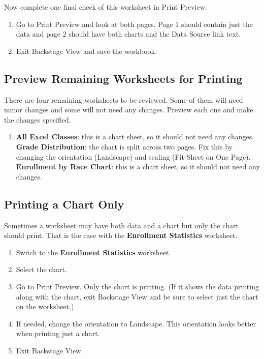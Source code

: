 Now complete one final check of this worksheet in Print Preview.

\begin{enumerate}
	\item Go to Print Preview and look at both pages. Page $ 1 $ should contain just the data and page $ 2 $ should have both charts and the Data Source link text.
	\item Exit Backstage View and save the workbook.
\end{enumerate}

\subsection{Preview Remaining Worksheets for Printing}

There are four remaining worksheets to be reviewed. Some of them will need minor changes and some will not need any changes. Preview each one and make the changes specified.

\begin{enumerate}
	\item \textbf{All Excel Classes}: this is a chart sheet, so it should not need any changes.
	\textbf{Grade Distribution}: the chart is split across two pages. Fix this by changing the orientation (Landscape) and scaling (Fit Sheet on One Page).
	\textbf{Enrollment by Race Chart}: this is a chart sheet, so it should not need any changes.
\end{enumerate}

\subsection{Printing a Chart Only}

Sometimes a worksheet may have both data and a chart but only the chart should print. That is the case with the \textbf{Enrollment Statistics} worksheet.

\begin{enumerate}
	\item Switch to the \textbf{Enrollment Statistics} worksheet.
	\item Select the chart.
	\item Go to Print Preview. Only the chart is printing. (If it shows the data printing along with the chart, exit Backstage View and be sure to select just the chart on the worksheet.)
	\item If needed, change the orientation to Landscape. This orientation looks better when printing just a chart.
	\item Exit Backstage View.
\end{enumerate}

